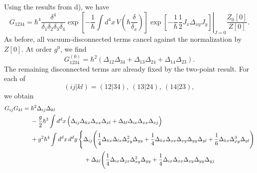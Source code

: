 \begin{enumerate}[label=\alph*)]
    \begin{solution}
        Using the results from d), we have
        \begin{equation}
            G_{1234}
            =\left.\hbar^4\frac{\delta^4}{\delta_1\delta_2\delta_3\delta_4}
            \exp\!\left[-\frac{1}{\hbar}\int d^4x\,
                V\!\left(\hbar\frac{\delta}{\delta_x}\right)\right]
            \exp\!\left[-\frac{1}{\hbar}\frac{1}{2}
                J_x\Delta_{xy}J_y\right]\right|_{J=0}
            \frac{Z_0[0]}{Z[0]}.
        \end{equation}
        As before, all vacuum-disconnected terms cancel against the
        normalization by $Z[0]$.  At order $g^0$, we find
        \begin{equation}
            G_{1234}^{(0)}
            =\hbar^2\left(
                \Delta_{12}\Delta_{34}
                +\Delta_{13}\Delta_{24}
                +\Delta_{14}\Delta_{23}
            \right).
        \end{equation}
        The remaining disconnected terms are already fixed by the two-point
        result.  For each of
        \begin{equation}
            (ij\vert kl)=(12\vert34),\ (13\vert24),\ (14\vert23),
        \end{equation}
        we obtain
        \begin{equation}
            \begin{aligned}
                G_{ij}G_{kl}={}&\hbar^2\Delta_{ij}\Delta_{kl}\\
                &-\frac{g}{2}\hbar^3\int d^dx\,\Big(
                    \Delta_{ij}\Delta_{kx}\Delta_{xx}\Delta_{xl}
                    +\Delta_{kl}\Delta_{ix}\Delta_{xx}\Delta_{xj}
                \Big)\\
                &+g^2\hbar^4\int d^dx\,d^dy\,\Bigg\{
                    \Delta_{ij}\Bigg(
                        \frac{1}{4}\Delta_{kx}\Delta_{lx}
                            \Delta_{xy}^2\Delta_{yy}
                        +\frac{1}{4}\Delta_{kx}\Delta_{xx}
                            \Delta_{xy}\Delta_{yy}\Delta_{yl}
                        +\frac{1}{6}\Delta_{kx}\Delta_{xy}^3\Delta_{yl}
                    \Bigg)\\
                &\hspace{31mm}
                    +\Delta_{kl}\Bigg(
                        \frac{1}{4}\Delta_{ix}\Delta_{jx}
                            \Delta_{xy}^2\Delta_{yy}
                        +\frac{1}{4}\Delta_{ix}\Delta_{xx}
                            \Delta_{xy}\Delta_{yy}\Delta_{yj}

\end{aligned}
\end{equation}
\end{solution}
\end{enumerate}
